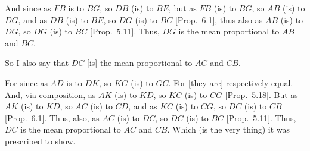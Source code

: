 \begin{Parallel}{}{}
{And since as $FB$ is to $BG$, so $DB$ (is) to $BE$, but as $FB$
(is) to $BG$, so $AB$ (is) to $DG$, and as $DB$ (is) to $BE$, so
$DG$ (is) to $BC$ [Prop.~6.1], thus also as $AB$ (is) to $DG$, so $DG$  (is) to $BC$ [Prop.~5.11]. Thus, $DG$ is the mean proportional
to $AB$ and $BC$.

So I also say that $DC$ [is] the mean proportional to $AC$ and $CB$.

\epsfysize=1.7in
\centerline{}

For since as $AD$ is to $DK$, so $KG$ (is) to $GC$. For [they are]  respectively equal. And, via composition, as $AK$ (is) to $KD$, so
$KC$ (is) to $CG$ [Prop.~5.18]. But as
$AK$ (is) to $KD$, so $AC$ (is) to $CD$, and as $KC$ (is) to $CG$,
so $DC$ (is) to $CB$ [Prop.~6.1]. Thus, also, as $AC$ (is) to $DC$, so
$DC$ (is) to $BC$ [Prop.~5.11]. Thus, $DC$ is the mean proportional to $AC$ and
$CB$. Which (is the very thing) it was prescribed to show.}
\end{Parallel}

